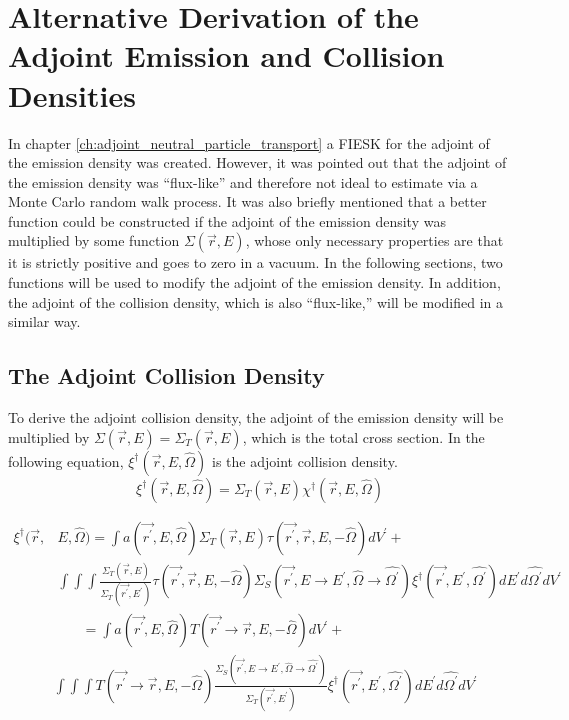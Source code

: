 \chapter{Alternative Derivation of the Adjoint Emission and Collision Densities}
\label{ch:appendix_a}

In chapter \ref{ch:adjoint_neutral_particle_transport} a FIESK for the adjoint
of the emission density was created. However, it was pointed out that the 
adjoint of the emission density was ``flux-like'' and therefore not ideal to
estimate via a Monte Carlo random walk process. It was also briefly mentioned
that a better function could be constructed if the adjoint of the emission
density was multiplied by some function $\Sigma(\vec{r},E)$, whose only 
necessary properties are that it is strictly positive and goes to zero in a 
vacuum. In the following sections, two functions will be used to modify the 
adjoint of the emission density. In addition, the adjoint of the collision 
density, which is also ``flux-like,'' will be modified in a similar way.

\section{The Adjoint Collision Density}
\label{sec:adjoint_collision_density}
To derive the adjoint collision density, the adjoint of the emission density
will be multiplied by $\Sigma(\vec{r},E) = \Sigma_T(\vec{r},E)$, which is the
total cross section. In the following equation,
$\xi^{\dagger}(\vec{r},E,\hat{\Omega})$ is the adjoint collision density.
\begin{equation}
  \xi^{\dagger}(\vec{r},E,\hat{\Omega}) = \Sigma_T(\vec{r},E)
  \chi^{\dagger}(\vec{r},E,\hat{\Omega})
  \label{eq:adj_collision_dens_to_adjoint_of_emission_dens}
\end{equation}

\begin{equation*}
  \begin{split}
  \xi^{\dagger}(\vec{r},&E,\hat{\Omega}) = \int a(\vec{r^{'}},E,\hat{\Omega}) 
    \Sigma_T(\vec{r},E) \tau(\vec{r^{'}},\vec{r},E,-\hat{\Omega}) dV^{'} + \\
    & \int\int\int  \frac{\Sigma_T(\vec{r},E)}{\Sigma_T(\vec{r^{'}},E^{'})}
      \tau(\vec{r^{'}},\vec{r},E,-\hat{\Omega}) 
    \Sigma_S(\vec{r^{'}},E \to E^{'},\hat{\Omega} \to \hat{\Omega^{'}})
    \xi^{\dagger}(\vec{r^{'}},E^{'},\hat{\Omega^{'}}) dE^{'}d\hat{\Omega^{'}}dV^{'}
  \end{split}
\end{equation*}
\begin{equation*}
  \begin{split}
  &\text{} \qquad = \int a(\vec{r^{'}},E,\hat{\Omega}) 
    T(\vec{r^{'}} \to \vec{r},E,-\hat{\Omega}) dV^{'} + \\
    & \int\int\int
      T(\vec{r^{'}} \to \vec{r},E,-\hat{\Omega})
      \frac{\Sigma_S(\vec{r^{'}},E \to E^{'},\hat{\Omega} \to \hat{\Omega^{'}})}
           {\Sigma_T(\vec{r^{'}},E^{'})}
    \xi^{\dagger}(\vec{r^{'}},E^{'},\hat{\Omega^{'}}) dE^{'}d\hat{\Omega^{'}}dV^{'}
  \end{split}
\end{equation*}

